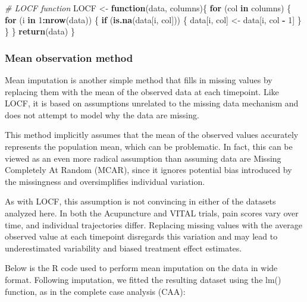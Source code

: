 \documentclass{article}
\newenvironment{Shaded}{\begin{snugshade}}{\end{snugshade}}
\newcommand{\CommentTok}[1]{\textcolor[rgb]{0.56,0.35,0.01}{\textit{#1}}}
\newcommand{\ControlFlowTok}[1]{\textcolor[rgb]{0.13,0.29,0.53}{\textbf{#1}}}
\newcommand{\DecValTok}[1]{\textcolor[rgb]{0.00,0.00,0.81}{#1}}
\newcommand{\FunctionTok}[1]{\textcolor[rgb]{0.13,0.29,0.53}{\textbf{#1}}}
\newcommand{\NormalTok}[1]{#1}
\newcommand{\OtherTok}[1]{\textcolor[rgb]{0.56,0.35,0.01}{#1}}
\newcommand{\SpecialCharTok}[1]{\textcolor[rgb]{0.81,0.36,0.00}{\textbf{#1}}}
\begin{document}
\begin{Shaded}
\begin{Highlighting}[]
\CommentTok{\# LOCF function}
\NormalTok{LOCF }\OtherTok{\textless{}{-}} \ControlFlowTok{function}\NormalTok{(data, columns)\{}
  \ControlFlowTok{for}\NormalTok{ (col }\ControlFlowTok{in}\NormalTok{ columns) \{}
    \ControlFlowTok{for}\NormalTok{ (i }\ControlFlowTok{in} \DecValTok{1}\SpecialCharTok{:}\FunctionTok{nrow}\NormalTok{(data)) \{  }
      \ControlFlowTok{if}\NormalTok{ (}\FunctionTok{is.na}\NormalTok{(data[i, col])) \{}
\NormalTok{        data[i, col] }\OtherTok{\textless{}{-}}\NormalTok{ data[i, col }\SpecialCharTok{{-}} \DecValTok{1}\NormalTok{]  }
\NormalTok{      \}}
\NormalTok{    \}}
\NormalTok{  \}}
  \FunctionTok{return}\NormalTok{(data)  }
\NormalTok{\}}
\end{Highlighting}
\end{Shaded}

\subsubsection{Mean observation method}\label{mean-observation-method}

Mean imputation is another simple method that fills in missing values by
replacing them with the mean of the observed data at each timepoint.
Like LOCF, it is based on assumptions unrelated to the missing data
mechanism and does not attempt to model why the data are missing.

This method implicitly assumes that the mean of the observed values
accurately represents the population mean, which can be problematic. In
fact, this can be viewed as an even more radical assumption than
assuming data are Missing Completely At Random (MCAR), since it ignores
potential bias introduced by the missingness and oversimplifies
individual variation.

As with LOCF, this assumption is not convincing in either of the
datasets analyzed here. In both the Acupuncture and VITAL trials, pain
scores vary over time, and individual trajectories differ. Replacing
missing values with the average observed value at each timepoint
disregards this variation and may lead to underestimated variability and
biased treatment effect estimates.

Below is the R code used to perform mean imputation on the data in wide
format. Following imputation, we fitted the resulting dataset using the
lm() function, as in the complete case analysis (CAA):
\end{document}
